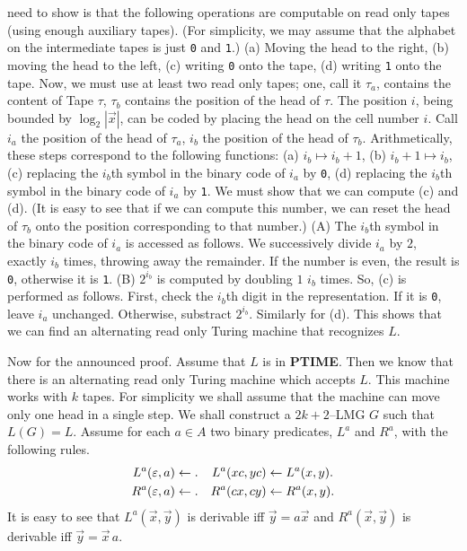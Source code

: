 need to show is that the following operations are computable on
read only tapes (using enough auxiliary tapes). (For simplicity,
we may assume that the alphabet on the intermediate tapes is just
{\tt 0} and {\tt 1}.) (a) Moving the head to the right, (b) moving
the head to the left, (c) writing {\tt 0} onto the tape, (d)
writing {\tt 1} onto the tape. Now, we must use at least two
read only tapes; one, call it $\tau_a$, contains the content of
Tape $\tau$, $\tau_b$ contains the position of the head of
$\tau$. The position $i$, being bounded by $\log_2 |\vec{x}|$,
can be coded by placing the head on the cell number $i$. Call 
$i_a$ the position of the head of $\tau_a$, $i_b$ the position 
of the head of $\tau_b$. Arithmetically, these steps correspond 
to the following functions: (a) $i_b \mapsto i_b+1$, 
(b) $i_b+1 \mapsto i_b$, (c) replacing the $i_b$th symbol
in the binary code of $i_a$ by {\tt 0}, (d) replacing the
$i_b$th symbol in the binary code of $i_a$ by {\tt 1}. We must
show that we can compute (c) and (d). (It is easy to see that
if we can compute this number, we can reset the head of $\tau_b$
onto the position corresponding to that number.) (A) The
$i_b$th symbol in the binary code of $i_a$ is accessed as follows.
We successively divide $i_a$ by $2$, exactly $i_b$ times,
throwing away the remainder. If the number is even, the result
is {\tt 0}, otherwise it is {\tt 1}. (B) $2^{i_b}$ is computed
by doubling $1$ $i_b$ times. So, (c) is performed as follows.
First, check the $i_b$th digit in the representation.
If it is {\tt 0}, leave $i_a$ unchanged. Otherwise, substract
$2^{i_b}$. Similarly for (d). This shows that we can find an
alternating read only Turing machine that recognizes $L$.
\proofend

Now for the announced proof. Assume that $L$ is in
\textbf{PTIME}. Then we know that there is an alternating
read only Turing machine which accepts $L$. This machine
works with $k$ tapes. For simplicity we shall assume that
the machine can move only one head in a single step.
We shall construct a $2k+2$--LMG $G$ such that $L(G) = L$.
Assume for each $a \in A$ two binary predicates, $L^a$ and $R^a$, 
with the following rules.
\begin{align}
L^a(\varepsilon,a) & \leftarrow . & L^a(xc,yc) & \leftarrow L^a(x,y). \\
R^a(\varepsilon,a) & \leftarrow . & R^a(cx,cy) & \leftarrow R^a(x,y).
\end{align}
It is easy to see that $L^a(\vec{x},\vec{y})$ is derivable iff
$\vec{y} = a \vec{x}$ and $R^a(\vec{x},\vec{y})$ is derivable iff
$\vec{y} = \vec{x}\, a$. 

